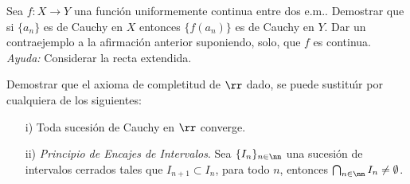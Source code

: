 \begin{ejercicio} Sea $f:X\to Y$ una funci\'on uniformemente
continua entre dos e.m.. Demostrar que si $\{a_n\}$ es de Cauchy
en $X$ entonces $\{f(a_n)\}$ es de Cauchy en $Y$. Dar un
contraejemplo a la afirmaci\'on anterior suponiendo, solo, que $f$
es continua. \emph{Ayuda:} Considerar la recta extendida.
\end{ejercicio}


\begin{ejercicio}\label{ejer,completitud} Demostrar que el axioma de completitud de $\rr$
dado, se puede sustitu\'{\i}r por cualquiera de los siguientes:
\begin{itemize}
    \item[i)] Toda sucesi\'on de Cauchy en $\rr$ converge.
    \item[ii)] \emph{Principio de Encajes de Intervalos}. Sea
    $\{I_n\}_{n\in\nn}$ una sucesi\'on de intervalos cerrados
    tales que $I_{n+1}\subset I_n$, para todo $n$, entonces
    $\bigcap_{n\in\nn}I_n\neq\emptyset$.
\end{itemize}
\end{ejercicio}
